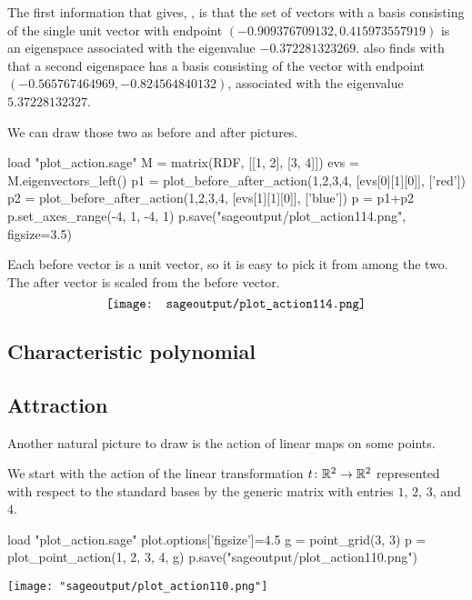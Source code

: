 The first information that \Sage{} gives, , 
is that the set of vectors with a basis consisting of the single unit
vector with endpoint $(-0.909376709132, 0.415973557919)$ is an
eigenspace associated with the eigenvalue $-0.372281323269$.
\Sage{} also finds with  that a second eigenspace
has a basis consisting of the vector with endpoint
$(-0.565767464969, -0.824564840132)$, associated with the
eigenvalue~$5.37228132327$. 

We can draw those two as before and after pictures.
\begin{sageoutput}[d,0,3]
load "plot_action.sage"  
M = matrix(RDF, [[1, 2], [3, 4]])
evs = M.eigenvectors_left()  
p1 = plot_before_after_action(1,2,3,4, [evs[0][1][0]], ['red']) 
p2 = plot_before_after_action(1,2,3,4, [evs[1][1][0]], ['blue']) 
p = p1+p2
p.set_axes_range(-4, 1, -4, 1) 
p.save("sageoutput/plot_action114.png", figsize=3.5)
\end{sageoutput}
\noindent
Each before vector is a unit vector, so it is easy to pick it from among the
two.
The after vector is scaled from the before vector.
\begin{equation*}
  \vcenteredhbox{\texttt{[image: sageoutput/plot\_action114.png]}}
\end{equation*}


\subsection{Characteristic polynomial}



\subsection{Attraction}
Another natural picture to draw is the action of linear maps on 
some points.

We start with the action of the linear transformation $\mbox{$t\colon \mathbb{R}^2\to \mathbb{R}^2$}$
represented with respect to the standard bases by the generic matrix with
entries $1$, $2$, $3$, and $4$.
\begin{sageoutput}
load "plot_action.sage"
plot.options['figsize']=4.5
g = point_grid(3, 3)
p = plot_point_action(1, 2, 3, 4, g)
p.save("sageoutput/plot_action110.png")  
\end{sageoutput}
\begin{center}
  \texttt{[image: "sageoutput/plot\_action110.png"]}
\end{center}




